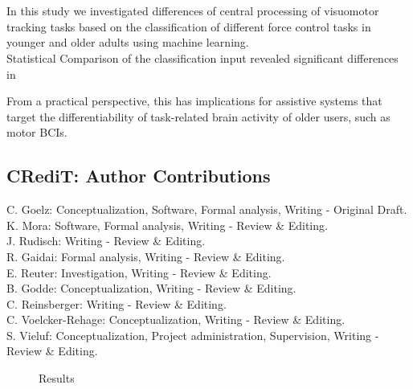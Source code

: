 \\
\\

In this study we investigated differences of central processing of visuomotor tracking tasks based on the classification of different force control tasks in younger and older adults using machine learning.\\

Statistical Comparison of the classification input revealed significant differences in 






From a practical perspective, this has implications for assistive systems that target the differentiability of task-related brain activity of older users, such as motor BCIs.\\




\subsection*{CRediT: Author Contributions}
C. Goelz: Conceptualization, Software, Formal analysis, Writing - Original Draft.\\
K. Mora: Software, Formal analysis, Writing - Review \& Editing.\\
J. Rudisch: Writing - Review \& Editing.\\
R. Gaidai: Formal analysis, Writing - Review \& Editing.\\ 
E. Reuter: Investigation, Writing - Review \& Editing.\\
B. Godde: Conceptualization, Writing - Review \& Editing.\\ 
C. Reinsberger: Writing - Review \& Editing.\\
C. Voelcker-Rehage: Conceptualization, Writing - Review \& Editing.\\ 
S. Vieluf: Conceptualization, Project administration, Supervision, Writing - Review \& Editing.\\

\begin{figure}[h]
\begin{center}

\caption[Reuslts]{Results}
\label{fig:DSI_exp1}
\end{center}
\end{figure}